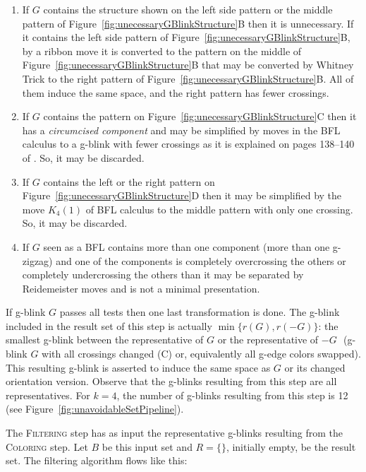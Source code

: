 \begin{enumerate}
\item If $G$ contains the structure shown
on the left side pattern or the middle pattern of
Figure~\ref{fig:unecessaryGBlinkStructure}B then it is unnecessary.
If it contains the left side pattern of
Figure~\ref{fig:unecessaryGBlinkStructure}B, by a ribbon move it is
converted to the pattern on the middle of
Figure~\ref{fig:unecessaryGBlinkStructure}B that may be converted by
Whitney Trick to the right pattern of
Figure~\ref{fig:unecessaryGBlinkStructure}B. All of them induce the
same space, and the right pattern has fewer crossings.

\item If $G$ contains the pattern on
Figure~\ref{fig:unecessaryGBlinkStructure}C then it has a {\it
circumcised component} and may be simplified by moves in the BFL
calculus to a g-blink with fewer crossings as it is explained on
pages 138--140 of \cite{KauffmanAndLins1994}. So, it may be discarded.

\item If $G$ contains the left or the right pattern on
Figure~\ref{fig:unecessaryGBlinkStructure}D then it may be simplified
by the move $K_4(1)$ of BFL calculus to the middle pattern with only
one crossing. So, it may be discarded.

\item If $G$ seen as a BFL contains more than one
component (more than one g-zigzag) and one of the components is completely
overcrossing the others or completely undercrossing the others than it may
be separated by Reidemeister moves and is not a minimal presentation.
\end{enumerate}
If g-blink $G$ passes all tests then one last transformation is done.
The g-blink included in the result set of this step is
actually $\min\{r(G), r(-G)\}$: the smallest g-blink
between the representative of $G$ or the representative of $-G$
\,\,(\ie g-blink $G$ with all crossings changed (C) or, equivalently
all g-edge colors swapped). This resulting g-blink is asserted to
induce the same space as $G$ or its changed orientation version. Observe
that the g-blinks resulting from this step are all representatives.  For $k=4$,
the number of g-blinks resulting from this step is 12 (see
Figure~\ref{fig:unavoidableSetPipeline}).

The \textsc{Filtering} step has as input the representative
g-blinks resulting from the \textsc{Coloring} step. Let $B$ be this
input set and $R = \{\}$, initially empty, be the result set.
The filtering algorithm flows like this:

